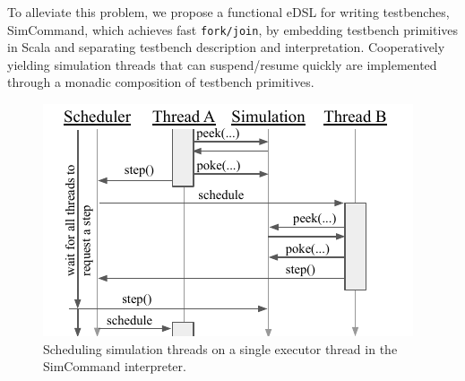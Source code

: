 \documentclass[sigplan,review,nonacm,9pt]{acmart}
\begin{document}



To alleviate this problem, we propose a functional eDSL for writing testbenches, SimCommand\cite{simcommand}, which achieves fast \texttt{fork/join}, by embedding testbench primitives in Scala and separating testbench description and interpretation.
Cooperatively yielding simulation threads that can suspend/resume quickly are implemented through a monadic composition of testbench primitives\cite{hardcaml_step_testbench}.



\begin{figure}[b]
\vspace{-3.5mm}
\includegraphics[scale=1]{simcommand/scheduler.pdf}
\caption{Scheduling simulation threads on a single executor thread in the SimCommand interpreter.}
\label{fig:simcommand_interp}
\end{figure}
\end{document}
